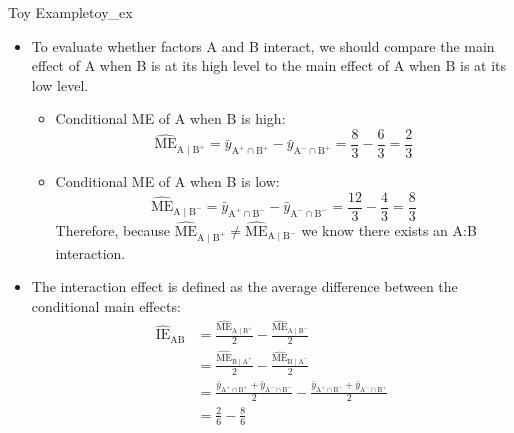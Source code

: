 \begin{Example}{Toy Example}{toy_ex}
\begin{itemize}
\begin{align*}
                   & =\frac{(6/3)+(8/3)}{2}-\frac{(4/3)+(12/3)}{2}                                      \\
                   & =-1/3
              \end{align*}
              Therefore, we expect the average response to go down by $ 1/3 $ when B is moved from its low to high level.
        \item To evaluate whether factors A and B interact, we should compare the main effect of A when B is at
              its high level to the main effect of A when B is at its low level.
              \begin{itemize}
                  \item Conditional ME of A when B is high:
                        \[ \widehat{\text{ME}}_{\text{A}\mid \text{B}^+}=\bar{y}_{\text{A}^+\cap \text{B}^+}-\bar{y}_{\text{A}^-\cap \text{B}^+}=\frac{8}{3}-\frac{6}{3}=\frac{2}{3} \]
                  \item Conditional ME of A when B is low:
                        \[ \widehat{\text{ME}}_{\text{A}\mid \text{B}^-}=\bar{y}_{\text{A}^+\cap \text{B}^-}-\bar{y}_{\text{A}^-\cap \text{B}^-}=\frac{12}{3}-\frac{4}{3} =\frac{8}{3} \]
                        Therefore, because $  \widehat{\text{ME}}_{\text{A}\mid \text{B}^+}\ne\widehat{\text{ME}}_{\text{A}\mid \text{B}^-} $ we know there exists an A:B interaction.
              \end{itemize}
        \item The interaction effect is defined as the average difference between the conditional main effects:
              \begin{align*}
                  \widehat{\text{IE}}_{\text{AB}}
                   & =\frac{\widehat{\text{ME}}_{\text{A}\mid \text{B}^+}}{2}-\frac{\widehat{\text{ME}}_{\text{A}\mid \text{B}^-}}{2}                                                     \\
                   & =\frac{\widehat{\text{ME}}_{\text{B}\mid \text{A}^+}}{2}-\frac{\widehat{\text{ME}}_{\text{B}\mid \text{A}^-}}{2}                                                     \\
                   & =\frac{\bar{y}_{\text{A}^+\cap \text{B}^+}+\bar{y}_{\text{A}^-\cap \text{B}^-}}{2}-\frac{\bar{y}_{\text{A}^+\cap \text{B}^-}+\bar{y}_{\text{A}^-\cap \text{B}^+}}{2} \\
                   & =\frac{2}{6}-\frac{8}{6}                                                                                                                                             \\

\end{align*}
\end{itemize}
\end{Example}

